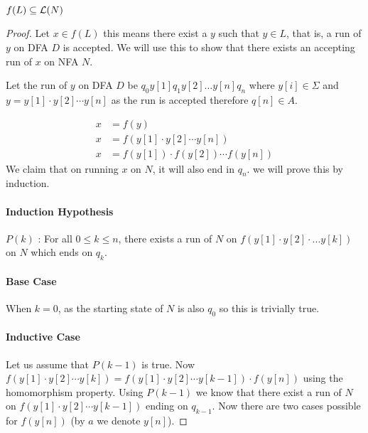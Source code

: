 \begin{soln}
	\begin{claim}
		$f(L) \subseteq \mathcal{L}(N)$
	\end{claim}
	\begin{proof}
		Let $x \in f(L)$ this means there exist a $y$ such that $y \in L$, that is, a run of $y$ on DFA $D$ is accepted. We will use this to show that there exists an accepting run of $x$ on NFA $N$.

		Let the run of $y$ on DFA $D$ be $q_0y[1]q_1y[2] \ldots y[n]q_n$ where $y[i] \in \Sigma$ and $y=y[1]\cdot y[2]\cdots y[n]$ as the run is accepted therefore $q[n] \in A$.

		\begin{align*}
			x & =f(y)                                  \\
			x & =f(y[1]\cdot y[2]\cdots y[n])         \\
			x & =f(y[1])\cdot f(y[2]) \cdots f(y[n])
		\end{align*}
		We claim that on running $x$ on $N$, it will also end in $q_n$. we will prove this by induction.

		\paragraph{Induction Hypothesis} $P(k)$ : For all $0 \leq k \leq n$, there exists a run of $N$ on $f(y[1]\cdot y[2]\cdot...y[k])$ on $N$ which ends on $q_k$.

		\paragraph{Base Case} When $k=0$, as the starting state of $N$ is also $q_0$ so this is trivially true.

		\paragraph{Inductive Case} Let us assume that $P(k-1)$ is true. Now $f(y[1]\cdot y[2]\cdots y[k]) =f(y[1]\cdot y[2]\cdots y[k-1]) \cdot f(y[n])$ using the homomorphism property. Using $P(k-1)$
        we know that there exist a run of $N$ on $f(y[1] \cdot y[2] \cdots y[k-1])$ ending on $q_{k-1}$. Now there are two cases possible for $f(y[n])$ (by $a$ we denote $y[n]$).


\end{proof}
\end{soln}
